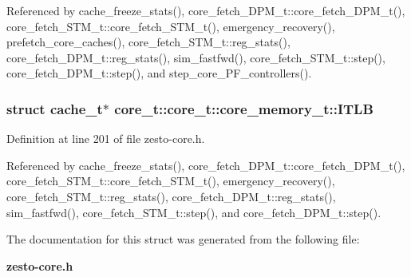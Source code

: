 Referenced by cache\_\-freeze\_\-stats(), core\_\-fetch\_\-DPM\_\-t::core\_\-fetch\_\-DPM\_\-t(), core\_\-fetch\_\-STM\_\-t::core\_\-fetch\_\-STM\_\-t(), emergency\_\-recovery(), prefetch\_\-core\_\-caches(), core\_\-fetch\_\-STM\_\-t::reg\_\-stats(), core\_\-fetch\_\-DPM\_\-t::reg\_\-stats(), sim\_\-fastfwd(), core\_\-fetch\_\-STM\_\-t::step(), core\_\-fetch\_\-DPM\_\-t::step(), and step\_\-core\_\-PF\_\-controllers().
\subsubsection[{ITLB}]{\setlength{\rightskip}{0pt plus 5cm}struct {\bf cache\_\-t}$\ast$ core\_\-t::core\_\-t::core\_\-memory\_\-t::ITLB\hspace{0.3cm}{\tt  [read]}}\label{structcore__t_1_1core__memory__t_e842ebfb4b6de70536a46020eaa92417}




Definition at line 201 of file zesto-core.h.

Referenced by cache\_\-freeze\_\-stats(), core\_\-fetch\_\-DPM\_\-t::core\_\-fetch\_\-DPM\_\-t(), core\_\-fetch\_\-STM\_\-t::core\_\-fetch\_\-STM\_\-t(), emergency\_\-recovery(), core\_\-fetch\_\-STM\_\-t::reg\_\-stats(), core\_\-fetch\_\-DPM\_\-t::reg\_\-stats(), sim\_\-fastfwd(), core\_\-fetch\_\-STM\_\-t::step(), and core\_\-fetch\_\-DPM\_\-t::step().

The documentation for this struct was generated from the following file:\begin{CompactItemize}
\item 
{\bf zesto-core.h}\end{CompactItemize}
